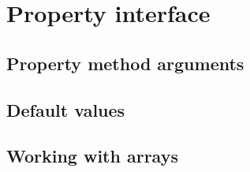 \section{Property interface}

\subsection{Property method arguments}

\subsection{Default values}

\subsection{Working with arrays}


